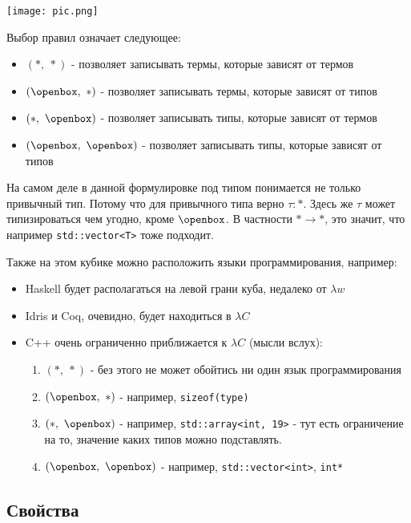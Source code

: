 \begin{center}
    {\texttt{[image: pic.png]}}
\end{center}

Выбор правил означает следующее:
\begin{itemize}
    \item $(*,\ *)$ - позволяет записывать термы, которые зависят от термов
    \item $(\openbox,\ *)$ - позволяет записывать термы, которые зависят от типов
    \item $(*,\ \openbox)$ - позволяет записывать типы, которые зависят от термов
    \item $(\openbox,\ \openbox)$ - позволяет записывать типы, которые зависят от типов
\end{itemize}

На самом деле в данной формулировке под типом понимается не только привычный тип. Потому что для привычного типа верно $\tau : *$. Здесь же $\tau$ может типизироваться чем угодно, кроме $\openbox$. В частности $* \rightarrow *$, это значит, что например \texttt{std::vector<T>} тоже подходит.

Также на этом кубике можно расположить языки программирования, например:
\begin{itemize}
    \item Haskell будет располагаться на левой грани куба, недалеко от $\lambda w$
    \item Idris и Coq, очевидно, будет находиться в $\lambda C$
    \item C++ очень ограниченно приближается к $\lambda C$ (мысли вслух):
    \begin{enumerate}
        \item $(*,\ *)$ - без этого не может обойтись ни один язык программирования
        \item $(\openbox,\ *)$ - например, \texttt{sizeof(type)}
        \item $(*,\ \openbox)$ - например, \texttt{std::array<int, 19>} - тут есть ограничение на то, значение каких типов можно подставлять.
        \item $(\openbox,\ \openbox)$ - например, \texttt{std::vector<int>}, \texttt{int*}
    \end{enumerate}
\end{itemize}

\subsection{Свойства}

